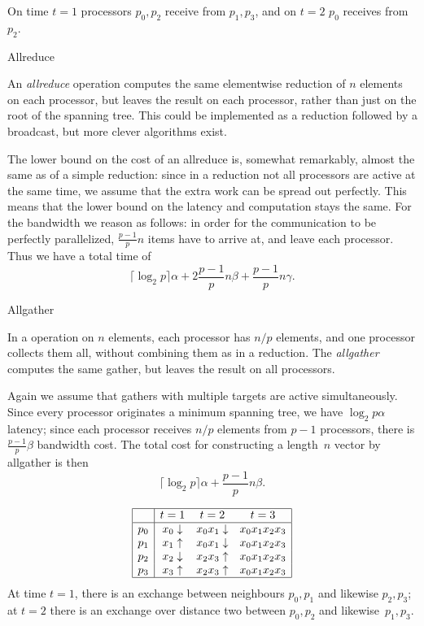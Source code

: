 On time $t=1$ processors $p_0,p_2$ receive from $p_1,p_3$, and on
$t=2$ $p_0$ receives from~$p_2$.


 {Allreduce}

An \emph{allreduce} operation computes the same elementwise reduction of $n$
elements on each processor, but leaves the result on each processor,
rather than just on the root of the spanning tree. This could be
implemented as a reduction followed by a broadcast, but more clever
algorithms exist.

The lower bound on the cost of an allreduce is, somewhat remarkably,
almost the same as of a simple reduction: since in a reduction not all
processors are active at the same time, we assume that the extra work
can be spread out perfectly. This means that the lower bound on the
latency and computation stays the same. For the bandwidth we reason as
follows: in order for the communication to be perfectly parallelized,
$\frac{p-1}p n$ items have to arrive at, and leave each
processor. Thus we have a total time of
\[ \lceil \log_2 p\rceil\alpha +2\frac{p-1}pn\beta
    +\frac{p-1}pn\gamma. \]


 {Allgather}

In a  operation on $n$ elements, each processor has
$n/p$ elements, and one processor collects them all, without combining
them as in a reduction. The \emph{allgather} computes the same gather,
but leaves the result on all processors.

Again we assume that gathers with multiple
targets are active simultaneously. Since every processor originates a
minimum spanning tree, we have $\log_2p\alpha$ latency; since each
processor receives $n/p$ elements from $p-1$ processors, there is
$\frac{p-1}p\beta$ bandwidth cost. The total cost for constructing a
length~$n$ vector by allgather is then
\[ \lceil \log_2 p\rceil\alpha +\frac{p-1}pn\beta. \]

\[
\begin{array}{|c|ccc|}
\hline
  &t=1&t=2&t=3\\ \hline
p_0&x_0\downarrow&x_0x_1\downarrow&x_0x_1x_2x_3\\
p_1&x_1\uparrow&x_0x_1\downarrow&x_0x_1x_2x_3\\
p_2&x_2\downarrow&x_2x_3\uparrow&x_0x_1x_2x_3\\
p_3&x_3\uparrow&x_2x_3\uparrow&x_0x_1x_2x_3\\
\hline
\end{array}
\]
At time $t=1$, there is an exchange between neighbours $p_0,p_1$ and
likewise $p_2,p_3$; at $t=2$ there is an exchange over distance two
between $p_0,p_2$ and likewise~$p_1,p_3$.

